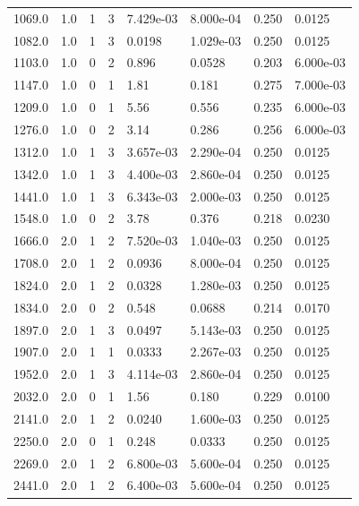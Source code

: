 \documentclass[preview]{standalone}
\begin{document}
{{\begin{tabular}{L{1.2cm}C{1.2cm} C{0.3cm}C{0.5cm} C{1.4cm}C{1.4cm} C{1.4cm}C{1.4cm}}
  1069.0  &   1.0  & 1     &  3 &  7.429e-03  & 8.000e-04  & 0.250 &  0.0125   \\ 
  1082.0  &   1.0  & 1     &  3 &  0.0198  & 1.029e-03  & 0.250 &  0.0125   \\ 
  1103.0  &   1.0  & 0     &  2 &  0.896  & 0.0528  & 0.203 &  6.000e-03   \\ 
  1147.0  &   1.0  & 0     &  1 &  1.81  & 0.181  & 0.275 &  7.000e-03   \\ 
  1209.0  &   1.0  & 0     &  1 &  5.56  & 0.556  & 0.235 &  6.000e-03   \\ 
  1276.0  &   1.0  & 0     &  2 &  3.14  & 0.286  & 0.256 &  6.000e-03   \\ 
  1312.0  &   1.0  & 1     &  3 &  3.657e-03  & 2.290e-04  & 0.250 &  0.0125   \\ 
  1342.0  &   1.0  & 1     &  3 &  4.400e-03  & 2.860e-04  & 0.250 &  0.0125   \\ 
  1441.0  &   1.0  & 1     &  3 &  6.343e-03  & 2.000e-03  & 0.250 &  0.0125   \\ 
  1548.0  &   1.0  & 0     &  2 &  3.78  & 0.376  & 0.218 &  0.0230   \\ 
  1666.0  &   2.0  & 1     &  2 &  7.520e-03  & 1.040e-03  & 0.250 &  0.0125   \\ 
  1708.0  &   2.0  & 1     &  2 &  0.0936  & 8.000e-04  & 0.250 &  0.0125   \\ 
  1824.0  &   2.0  & 1     &  2 &  0.0328  & 1.280e-03  & 0.250 &  0.0125   \\ 
  1834.0  &   2.0  & 0     &  2 &  0.548  & 0.0688  & 0.214 &  0.0170   \\ 
  1897.0  &   2.0  & 1     &  3 &  0.0497  & 5.143e-03  & 0.250 &  0.0125   \\ 
  1907.0  &   2.0  & 1     &  1 &  0.0333  & 2.267e-03  & 0.250 &  0.0125   \\ 
  1952.0  &   2.0  & 1     &  3 &  4.114e-03  & 2.860e-04  & 0.250 &  0.0125   \\ 
  2032.0  &   2.0  & 0     &  1 &  1.56  & 0.180  & 0.229 &  0.0100   \\ 
  2141.0  &   2.0  & 1     &  2 &  0.0240  & 1.600e-03  & 0.250 &  0.0125   \\ 
  2250.0  &   2.0  & 0     &  1 &  0.248  & 0.0333  & 0.250 &  0.0125   \\ 
  2269.0  &   2.0  & 1     &  2 &  6.800e-03  & 5.600e-04  & 0.250 &  0.0125   \\ 
  2441.0  &   2.0  & 1     &  2 &  6.400e-03  & 5.600e-04  & 0.250 &  0.0125   \\ 

\end{tabular}}}
\end{document}
